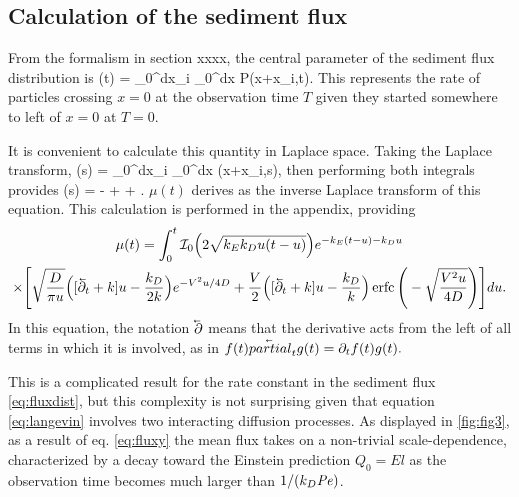 \subsection{Calculation of the sediment flux}

From the formalism in section xxxx, the central parameter of the sediment flux distribution is 
\be \mu(t) = \rho \int_0^\infty dx_i \int_0^\infty dx P(x+x_i,t).\ee
This represents the rate of particles crossing $x=0$ at the observation time $T$ given they started somewhere to left of $x=0$ at $T=0$.

It is convenient to calculate this quantity in Laplace space.   
Taking the Laplace transform,
\be \tilde{\mu}(s) = \rho \int_0^\infty dx_i \int_0^\infty dx (x+x_i,s),\ee
then performing both integrals provides
\be  \tilde{\mu}(s) = - +  + . \label{eq:laplacefluxrate}\ee
$\mu(t)$ derives as the inverse Laplace transform of this equation. 
This calculation is performed in the appendix, providing
\begin{multline} 
\mu(t) = \int_0^t \mathcal{I}_0\Big(2\sqrt{k_Ek_Du(t-u)}\Big)e^{-k_E(t-u)-k_D u} \\
\times \Bigg[\sqrt{\frac{D}{\pi u}}\Big([\cev{\partial_t} + k]u-\frac{k_D}{2 k}\Big)e^{-V^2 u/4D} + \frac{V}{2}\Big([\cev{\partial_t} + k]u -\frac{k_D}{k}\Big) \erfc\Bigg(-\sqrt{\frac{V^2 u}{4D}}\Bigg)\Bigg] du. \label{eq:fluxy}
\end{multline}
In this equation, the notation $\cev{\partial}$ means that the derivative acts from the left of all terms in which it is involved, as in $f(t)\cev{partial}_t g(t) = \partial_t f(t)g(t).$

This is a complicated result for the rate constant in the sediment flux \ref{eq:fluxdist}, but this complexity is not surprising given that equation \ref{eq:langevin} involves two interacting diffusion processes. As displayed in \ref{fig:fig3}, as a result of eq. \ref{eq:fluxy} the mean flux takes on a non-trivial scale-dependence, characterized by a decay toward the Einstein prediction $Q_0 = E l$ as the observation time becomes much larger than $1/(k_D \mbox{\textit{Pe}})$. 

